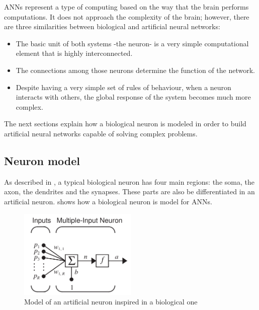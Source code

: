\label{sec:ANN}
ANNs represent a type of computing based on the way that the brain
performs computations. It does not approach the complexity of the
brain; however, there are three similarities between biological and
artificial neural networks:

\begin{itemize}
	\item The basic unit of both systems -the neuron- is a very
	simple computational element that is highly
	interconnected.  

        \item The connections among those neurons determine the
	function of the network.

        \item Despite having a very simple set of rules of behaviour,
	when a neuron interacts with others, the global response of
	the system becomes much more complex.
\end{itemize}

The next sections explain how a biological neuron is modeled in order
to build artificial neural networks capable of solving complex
problems.

\subsection{Neuron model}
\label{subsec:neuronmodel}

As described in , a typical biological neuron has four
main regions: the soma, the axon, the dendrites and the
synapses. These parts are also be differentiated in an artificial
neuron.  shows how a biological neuron is model
for ANNs.

\begin{figure}[!ht]
\centering
\includegraphics[width=0.5\textwidth]{images/neuronmodel.png}
\caption{Model of an artificial neuron inspired in a biological one}
\label{fig:aneuronmodel}
\end{figure}

